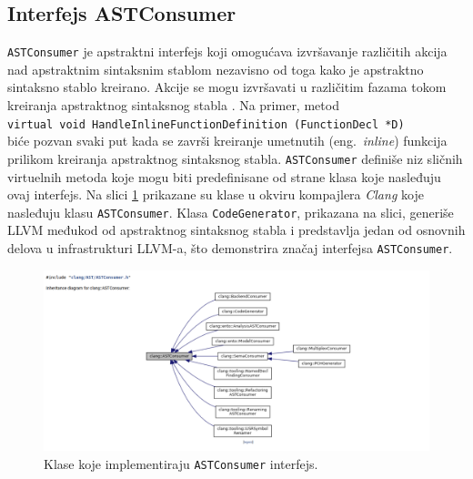 \documentclass[12pt,oneside]{memoir}
\begin{document}
\subsection{Interfejs ASTConsumer}

\texttt{ASTConsumer} je apstraktni interfejs koji omogu\'{c}ava izvr\v{s}avanje razli\v{c}itih akcija nad apstraktnim sintaksnim stablom nezavisno od toga kako je apstraktno sintaksno stablo kreirano.
Akcije se mogu izvr\v{s}avati u razli\v{c}itim fazama tokom kreiranja apstraktnog sintaksnog stabla \cite{ASTToolTutorial}. Na primer, metod \\ \texttt{virtual void  HandleInlineFunctionDefinition (FunctionDecl *D)} \\ bi\'{c}e pozvan svaki put kada se zavr\v{s}i kreiranje umetnutih (eng.~\textit{inline}) funkcija prilikom kreiranja apstraktnog sintaksnog stabla. \texttt{ASTConsumer} defini\v{s}e niz sli\v{c}nih virtuelnih metoda koje mogu biti predefinisane od strane klasa koje nasleđuju ovaj interfejs. 
Na slici \ref{fig:inhDiagram} prikazane su klase u okviru kompajlera \textit{Clang} koje nasleđuju klasu \texttt{ASTConsumer}. Klasa \texttt{CodeGenerator}, prikazana na slici,
generi\v{s}e LLVM međukod od apstraktnog sintaksnog stabla i predstavlja jedan od osnovnih delova u infrastrukturi LLVM-a, \v{s}to demonstrira zna\v{c}aj interfejsa \texttt{ASTConsumer}. 

\begin{figure}[!h]
\begin{center}
\includegraphics[scale=0.3]{ASTConsumer2.png}
\end{center}
\caption{Klase koje implementiraju \texttt{ASTConsumer} interfejs.}
\label{fig:inhDiagram}
\end{figure}
\end{document}
